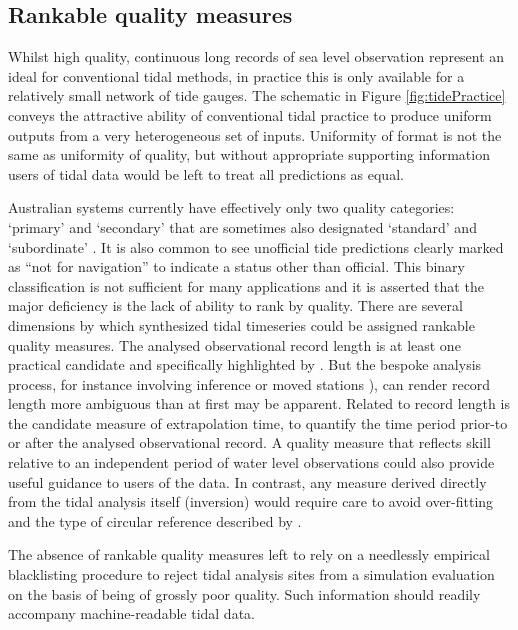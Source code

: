 \subsection{Rankable quality measures}
\label{sec:quality}
Whilst high quality, continuous long records of sea level observation represent an ideal for conventional tidal methods, in practice this is only available for a relatively small network of tide gauges.   
The schematic in Figure \ref{fig:tidePractice} conveys the attractive ability of conventional tidal practice to produce uniform outputs from a very heterogeneous set of inputs.
Uniformity of format is not the same as uniformity of quality, but without appropriate supporting information users of tidal data would be left to treat all predictions as equal.  

Australian systems currently have effectively only two quality categories: `primary' and `secondary' \cite{austides} that are sometimes also designated `standard' and `subordinate'  \cite{PCTMSL-sp9}.   
It is also common to see unofficial tide predictions clearly marked as ``not for navigation'' to indicate a status other than official.
This binary classification is not sufficient for many applications and it is asserted that the major deficiency is the lack of ability to rank by quality.   There are several dimensions by which synthesized tidal timeseries could be assigned rankable quality measures.    
The analysed observational record length is at least one practical candidate and specifically highlighted by \citeauthor{MHL2156}. But the bespoke analysis process, for instance involving inference or moved stations \cite{godin:1972}), can render record length more ambiguous than at first may be apparent.    
Related to record length is the candidate measure of extrapolation time, to quantify the time period prior-to or after the analysed observational record.     
A quality measure that reflects skill relative to an independent period of water level observations could also provide useful guidance to users of the data.    In contrast, any measure derived directly from the tidal analysis itself (inversion) would require care to avoid over-fitting and the type of circular reference described by  \citeauthor{Thompson2019}. 

The absence of rankable quality measures left \citeauthor{10.5194/os-2020-107} to rely on a needlessly empirical blacklisting procedure to reject tidal analysis sites from a simulation evaluation on the basis of being of grossly poor quality. Such information should readily accompany machine-readable tidal data.

